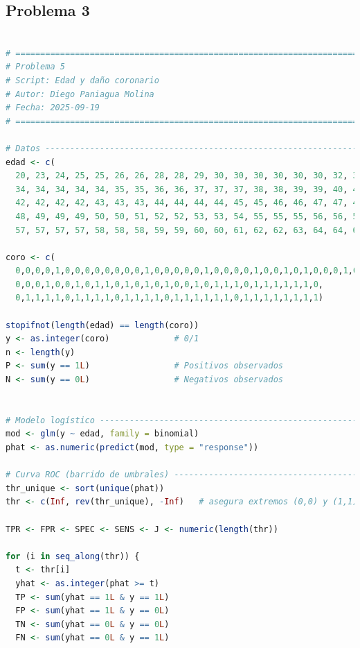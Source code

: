 \clearpage

\subsection{Problema \textcolor{CIMATRed}{3}}

\begin{lstlisting}[language=R, caption={Script: Edad y daño coronario}, label={lst:script4}]

# =============================================================================
# Problema 5
# Script: Edad y daño coronario
# Autor: Diego Paniagua Molina
# Fecha: 2025-09-19
# =============================================================================

# Datos -----------------------------------------------------------------------
edad <- c(
  20, 23, 24, 25, 25, 26, 26, 28, 28, 29, 30, 30, 30, 30, 30, 30, 32, 32, 33, 33, 
  34, 34, 34, 34, 34, 35, 35, 36, 36, 37, 37, 37, 38, 38, 39, 39, 40, 40, 41, 41, 
  42, 42, 42, 42, 43, 43, 43, 44, 44, 44, 44, 45, 45, 46, 46, 47, 47, 47, 48, 48, 
  48, 49, 49, 49, 50, 50, 51, 52, 52, 53, 53, 54, 55, 55, 55, 56, 56, 56, 57, 57, 
  57, 57, 57, 57, 58, 58, 58, 59, 59, 60, 60, 61, 62, 62, 63, 64, 64, 65, 69)

coro <- c(
  0,0,0,0,1,0,0,0,0,0,0,0,0,1,0,0,0,0,0,1,0,0,0,0,1,0,0,1,0,1,0,0,0,1,0,1,0,
  0,0,0,1,0,0,1,0,1,1,0,1,0,1,0,1,0,0,1,0,1,1,1,0,1,1,1,1,1,1,0,
  0,1,1,1,1,0,1,1,1,1,0,1,1,1,1,0,1,1,1,1,1,1,0,1,1,1,1,1,1,1,1)

stopifnot(length(edad) == length(coro))
y <- as.integer(coro)             # 0/1
n <- length(y)
P <- sum(y == 1L)                 # Positivos observados
N <- sum(y == 0L)                 # Negativos observados


# Modelo logístico ------------------------------------------------------------
mod <- glm(y ~ edad, family = binomial)
phat <- as.numeric(predict(mod, type = "response"))

# Curva ROC (barrido de umbrales) ---------------------------------------------
thr_unique <- sort(unique(phat))
thr <- c(Inf, rev(thr_unique), -Inf)   # asegura extremos (0,0) y (1,1)

TPR <- FPR <- SPEC <- SENS <- J <- numeric(length(thr))

for (i in seq_along(thr)) {
  t <- thr[i]
  yhat <- as.integer(phat >= t)
  TP <- sum(yhat == 1L & y == 1L)
  FP <- sum(yhat == 1L & y == 0L)
  TN <- sum(yhat == 0L & y == 0L)
  FN <- sum(yhat == 0L & y == 1L)
  

\end{lstlisting}

